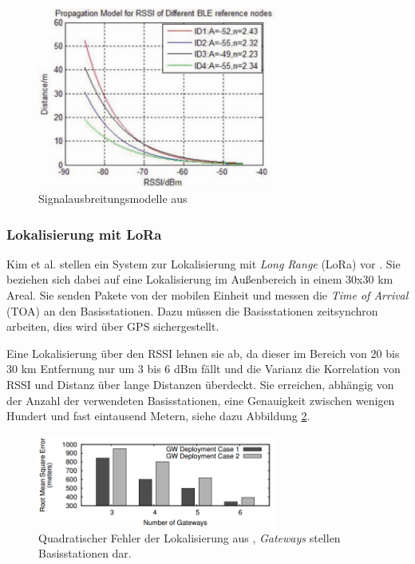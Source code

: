 \begin{figure}[h]
  \centering
	\includegraphics[width=0.7\textwidth]{images/blemodel.png}
  \caption{Signalausbreitungsmodelle aus \cite{jianyong2014rssi}}
  \label{fig:blemodel}
\end{figure}

\subsubsection{Lokalisierung mit LoRa}
\label{ch:Vorherige:sec:lora}
Kim et al. stellen ein System zur Lokalisierung mit \emph{Long Range} (LoRa) vor \cite{kim2016poster}.
Sie beziehen sich dabei auf eine Lokalisierung im Außenbereich in einem 30x30 km Areal. 
Sie senden Pakete von der mobilen Einheit und messen die \emph{Time of Arrival} (TOA) an den Basisstationen.
Dazu müssen die Basisstationen zeitsynchron arbeiten, dies wird über GPS sichergestellt.

Eine Lokalisierung über den RSSI lehnen sie ab, da dieser im Bereich von 20 bis 30 km Entfernung nur um 3 bis 6 dBm fällt und die Varianz die Korrelation von RSSI und Distanz über lange Distanzen überdeckt.
Sie erreichen, abhängig von der Anzahl der verwendeten Basisstationen, eine Genauigkeit zwischen wenigen Hundert und fast eintausend Metern, siehe dazu Abbildung \ref{fig:loraacc}.

\begin{figure}[h]
  \centering
	\includegraphics[width=0.7\textwidth]{images/loraacc.png}
  \caption{Quadratischer Fehler der Lokalisierung aus \cite{kim2016poster}, \emph{Gateways} stellen Basisstationen dar.}
  \label{fig:loraacc}
\end{figure}


